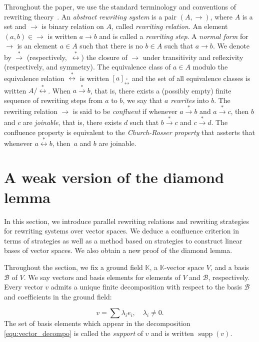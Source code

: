 \documentclass[11pt]{article}
\theoremstyle{definition}
\newcommand\basis{\mathscr{B}}
\DeclareMathOperator{\supp}{supp}
\newcommand\K{\mathbb{K}}
\newcommand\transRew{\overset{*}{\to}}
\newcommand\rewEquiv{\overset{*}{\leftrightarrow}}
\begin{document}
Throughout the paper, we use the standard terminology and conventions of
rewriting theory~\cite{MR1629216}. An {\em abstract rewriting system} is
a pair $(A,\to)$, where $A$ is a set and $\to$ is binary relation on $A$,
called {\em rewriting relation}. An element~$(a,b)\in\to$ is written
$a\to b$ and is called a {\em rewriting step}. A {\em normal form} for
$\to$ is an element $a\in A$ such that there is no $b\in A$ such that
$a\to b$. We denote by $\transRew$  (respectively,~$\rewEquiv$) the
closure of $\to$ under transitivity and reflexivity (respectively, and
symmetry). The equivalence class of $a\in A$ modulo the equivalence
relation $\rewEquiv$ is written $[a]_{\rewEquiv}$ and the set of all
equivalence classes is written $A/\rewEquiv$. When $a\transRew b$, that
is, there exists a (possibly empty) finite sequence of rewriting steps
from $a$ to  $b$, we say that $a$ {\em rewrites} into $b$. The rewriting
relation $\to$ is said to be {\em confluent} if whenever $a\transRew b$
and $a\transRew c$, then $b$ and $c$ are {\em joinable}, that is, there
exists $d$ such that $b\transRew c$ and $c\transRew d$. The confluence
property is equivalent to the {\em Church-Rosser property} that assterts
that whenever $a\rewEquiv b$, then~$a$ and $b$ are joinable.

\section{A weak version of the diamond lemma}
\label{sec:a_weak_version_of_the_diamond_lemma}

In this section, we introduce parallel rewriting relations and rewriting
strategies for rewriting systems over vector spaces. We deduce a
confluence criterion in terms of strategies as well as a method based on
strategies to construct linear bases of vector spaces. We also obtain a
new proof of the diamond lemma.
\medskip

Throughout the section, we fix a ground field $\K$, a $\K$-vector space
$V$, and a basis $\basis$ of $V$. We say vectors and basis elements for
elements of $V$ and $\basis$, respectively. Every vector $v$ admits a
unique finite decomposition with respect to the basis $\basis$ and
coefficients in the ground field:

\begin{equation}\label{equ:vector_decompo}
  v=\sum\lambda_ie_i,\quad\lambda_i\neq 0.
\end{equation}
The set of basis elements which appear in the decomposition
\eqref{equ:vector_decompo} is called the {\it support} of $v$ and is
written $\supp(v)$. 
\end{document}
